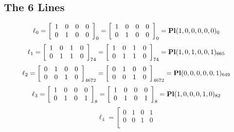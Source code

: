 \documentclass{article}
\begin{document}
{\subsection*{The 6 Lines}
$$
\ell_{0} = 
\left[
\begin{array}{*{4}{r}}
1 & 0 & 0 & 0\\
0 & 1 & 0 & 0\\
\end{array}
\right]
_{0}
=
\left[
\begin{array}{*{4}c}
1  & 0  & 0  & 0\\
0  & 1  & 0  & 0\\
\end{array}
\right]_{0}
={\rm\bf Pl}(1,0,0,0,0,0 )_{0}$$
$$
\ell_{1} = 
\left[
\begin{array}{*{4}{r}}
1 & 0 & 1 & 0\\
0 & 1 & 1 & 0\\
\end{array}
\right]
_{74}
=
\left[
\begin{array}{*{4}c}
1  & 0  & 1  & 0\\
0  & 1  & 1  & 0\\
\end{array}
\right]_{74}
={\rm\bf Pl}(1,0,1,0,0,1 )_{665}$$
$$
\ell_{2} = 
\left[
\begin{array}{*{4}{r}}
0 & 1 & 0 & 0\\
0 & 0 & 1 & 0\\
\end{array}
\right]
_{4672}
=
\left[
\begin{array}{*{4}c}
0  & 1  & 0  & 0\\
0  & 0  & 1  & 0\\
\end{array}
\right]_{4672}
={\rm\bf Pl}(0,0,0,0,0,1 )_{649}$$
$$
\ell_{3} = 
\left[
\begin{array}{*{4}{r}}
1 & 0 & 0 & 0\\
0 & 1 & 0 & 1\\
\end{array}
\right]
_{8}
=
\left[
\begin{array}{*{4}c}
1  & 0  & 0  & 0\\
0  & 1  & 0  & 1\\
\end{array}
\right]_{8}
={\rm\bf Pl}(1,0,0,0,1,0 )_{82}$$
$$
\ell_{4} = 
\left[
\begin{array}{*{4}{r}}
0 & 1 & 0 & 1\\
0 & 0 & 1 & 0\\
\end{array}
$$}
\end{document}
